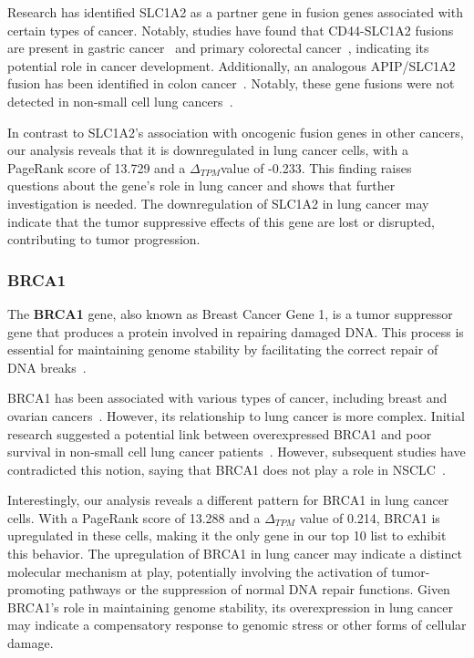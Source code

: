 Research has identified SLC1A2 as a partner gene in fusion genes associated with certain types of cancer.
Notably, studies have found that CD44-SLC1A2 fusions are present in gastric cancer~\cite{Tao2011CD44} and
primary colorectal cancer~\cite{Shinmura2015CD44}, indicating its potential role in cancer development.
Additionally, an analogous APIP/SLC1A2 fusion has been identified in colon cancer~\cite{Giacomini2013Breakpoint}.
Notably, these gene fusions were not detected in non-small cell lung cancers~\cite{Shinmura2015CD44}.

In contrast to SLC1A2's association with oncogenic fusion genes in other cancers,
our analysis reveals that it is downregulated in lung cancer cells,
with a PageRank score of 13.729 and a $\Delta_{TPM}$value of -0.233.
This finding raises questions about the gene's role in lung cancer and shows that further investigation is needed.
The downregulation of SLC1A2 in lung cancer may indicate that the tumor suppressive effects of this gene are lost or disrupted,
contributing to tumor progression.
\newline

\subsubsection*{BRCA1} \label{subsubsec:brca1}
The \textbf{BRCA1} gene, also known as Breast Cancer Gene 1, is a tumor suppressor gene
that produces a protein involved in repairing damaged DNA\@.
This process is essential for maintaining genome stability by facilitating the correct repair of DNA breaks~\cite{NCI2020BRCA1}.

BRCA1 has been associated with various types of cancer, including breast and ovarian cancers~\cite{Lee2020BRCA1}.
However, its relationship to lung cancer is more complex.
Initial research suggested a potential link between overexpressed BRCA1 and
poor survival in non-small cell lung cancer patients~\cite{Rosell2007BRCA1}.
However, subsequent studies have contradicted this notion,
saying that BRCA1 does not play a role in NSCLC~\cite{Gachechiladze2012BRCA1,Lee2020BRCA1}.

Interestingly, our analysis reveals a different pattern for BRCA1 in lung cancer cells.
With a PageRank score of 13.288 and a $\Delta_{TPM}$ value of 0.214,
BRCA1 is upregulated in these cells, making it the only gene in our top 10 list to exhibit this behavior.
The upregulation of BRCA1 in lung cancer may indicate a distinct molecular mechanism at play,
potentially involving the activation of tumor-promoting pathways or the suppression of normal DNA repair functions.
Given BRCA1's role in maintaining genome stability,
its overexpression in lung cancer may indicate a compensatory response to genomic stress or other forms of cellular damage.
\newline

